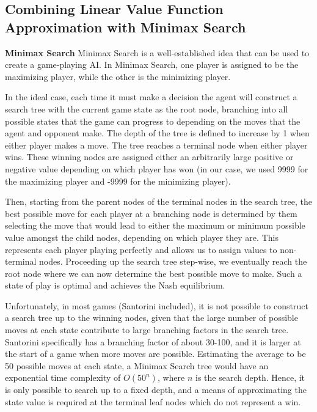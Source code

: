 \documentclass[a4paper,12pt,table]{article}
\begin{document}
\subsection{Combining Linear Value Function Approximation with Minimax Search}

\textbf{Minimax Search}
\newline
Minimax Search is a well-established idea that can be used to create a game-playing AI. \cite{Artificial Intelligence: A Modern Approach} In Minimax Search, one player is assigned to be the maximizing player, while the other is the minimizing player. \par

In the ideal case, each time it must make a decision the agent will construct a search tree with the current game state as the root node, branching into all possible states that the game can progress to depending on the moves that the agent and opponent make. The depth of the tree is defined to increase by 1 when either player makes a move. The tree reaches a terminal node when either player wins. These winning nodes are assigned either an arbitrarily large positive or negative value depending on which player has won (in our case, we used 9999 for the maximizing player and -9999 for the minimizing player). \par

Then, starting from the parent nodes of the terminal nodes in the search tree, the best possible move for each player at a branching node is determined by them selecting the move that would lead to either the maximum or minimum possible value amongst the child nodes, depending on which player they are. This represents each player playing perfectly and allows us to assign values to non-terminal nodes. Proceeding up the search tree step-wise, we eventually reach the root node where we can now determine the best possible move to make. Such a state of play is optimal and achieves the Nash equilibrium. \par

Unfortunately, in most games (Santorini included), it is not possible to construct a search tree up to the winning nodes, given that the large number of possible moves at each state contribute to large branching factors in the search tree. Santorini specifically has a branching factor of about 30-100, and it is larger at the start of a game when more moves are possible. Estimating the average to be 50 possible moves at each state, a Minimax Search tree would have an exponential time complexity of $O(50^n)$, where $n$ is the search depth. Hence, it is only possible to search up to a fixed depth, and a means of approximating the state value is required at the terminal leaf nodes which do not represent a win.\par
\end{document}
